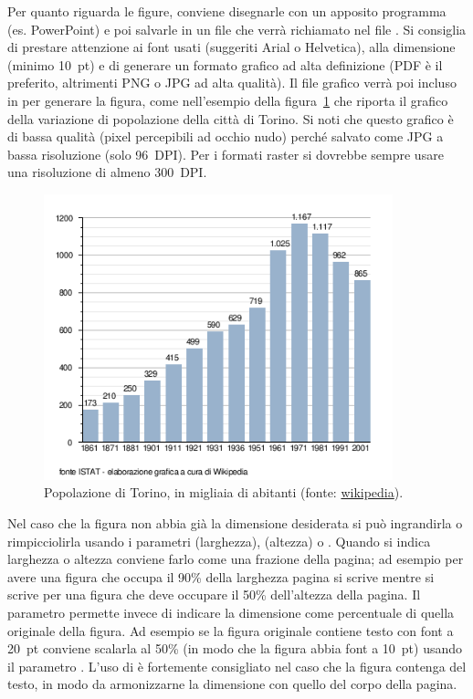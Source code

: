 Per quanto riguarda le figure, conviene disegnarle con un apposito programma (es. PowerPoint) e poi salvarle in un file che verrà richiamato nel file \ltx. Si consiglia di prestare attenzione ai font usati (suggeriti Arial o Helvetica), alla dimensione (minimo \SI{10}{pt}) e di generare un formato grafico ad alta definizione (PDF è il preferito, altrimenti PNG o JPG ad alta qualità).
Il file grafico verrà poi incluso in \ltx per generare la figura, come nell'esempio della figura~\ref{fig:popTorino} che riporta il grafico della variazione di popolazione della città di Torino.
Si noti che questo grafico è di bassa qualità (pixel percepibili ad occhio nudo) perché salvato come JPG a bassa risoluzione (solo \SI{96}{DPI}).
Per i formati raster si dovrebbe sempre usare una risoluzione di almeno \SI{300}{DPI}.
%
\begin{figure}[tbh]%
\centerline{\includegraphics[width=0.9\textwidth]{torino.png}}
\caption{Popolazione di Torino, in migliaia di abitanti (fonte: \href{http://it.wikipedia.org/wiki/Torino}{wikipedia}).\label{fig:popTorino}}
\end{figure}
%
Nel caso che la figura non abbia già la dimensione desiderata si può ingrandirla o rimpicciolirla usando i parametri  (larghezza),  (altezza) o . Quando si indica larghezza o altezza conviene farlo come una frazione della pagina; ad esempio per avere una figura che occupa il 90\% della larghezza pagina si scrive  mentre si scrive  per una figura che deve occupare il 50\% dell'altezza della pagina.
Il parametro  permette invece di indicare la dimensione come percentuale di quella originale della figura. Ad esempio se la figura originale contiene testo con font a \SI{20}{pt} conviene scalarla al 50\% (in modo che la figura abbia font a \SI{10}{pt}) usando il parametro . L'uso di  è fortemente consigliato nel caso che la figura contenga del testo, in modo da armonizzarne la dimensione con quello del corpo della pagina.

